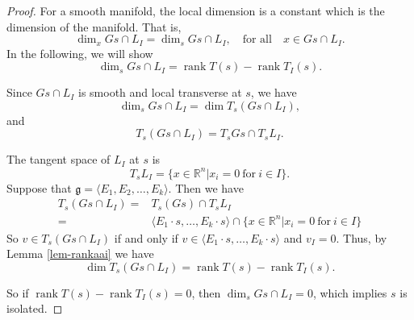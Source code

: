 \documentclass[10pt,a4paper]{amsart}
\numberwithin{equation}{section}
\begin{document}
\begin{proof}
For a smooth manifold, the local dimension is a constant which is the dimension of the manifold. That is, 
$$\dim_x Gs\cap L_I=\dim_s Gs\cap L_I,\quad\text{for all}\quad x\in Gs\cap L_I.$$
In the following, we will show
$$\dim_s Gs\cap L_I=\operatorname{rank}T(s)-\operatorname{rank}T_I(s).$$

Since $Gs\cap L_I$ is smooth and local transverse at $s$, we have 
$$\dim_s Gs\cap L_I=\dim T_s (Gs\cap L_I),$$
and
$$T_s (Gs\cap L_I)=T_s Gs \cap T_s L_I.$$

The tangent space of $L_I$ at $s$ is
$$T_s L_I=\{x\in \mathbb{R}^n|x_i=0~\text{for}~i\in I\}.$$
Suppose that $\mathfrak{g}=\langle E_1, E_2,\ldots, E_k\rangle$. Then we have
\begin{align*}
 T_s (Gs\cap L_I)=&T_s (Gs) \cap T_s L_I \\
      =&\langle E_1\cdot s,\ldots, E_k \cdot s \rangle \cap \{x\in \mathbb{R}^n|x_i=0~\text{for}~i\in I\}
\end{align*}
So $v\in T_s (Gs\cap L_I)$ if and only if $v\in \langle E_1\cdot s,\ldots, E_k \cdot s \rangle$ and $v_I=0$. Thus, by Lemma \ref{lem-rankaai} we have
$$\dim T_s (Gs\cap L_I)=\operatorname{rank}T(s)-\operatorname{rank}T_I(s).$$

So if $\operatorname{rank}T(s)-\operatorname{rank}T_I(s)=0$, then $\dim_s Gs\cap L_I=0$, which implies $s$ is isolated.
\end{proof}
\end{document}
